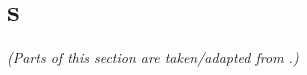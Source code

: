 \documentclass{article}
\begin{document}
\section{{\HCWL}s}\label{sec:hcwl}
\textit{(Parts of this section are taken/adapted from \cite{GGJLM24}.)}
















{\small


}
\end{document}
